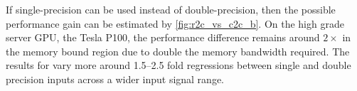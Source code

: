 If single-precision can be used instead of double-precision, then the possible performance gain can be estimated by \cref{fig:r2c_vs_c2c_b}. On the high grade server GPU, the \nvidia{} Tesla P100, the performance difference remains around $2{\times}$ in the memory bound region due to double the memory bandwidth required. The results for \fftw{} vary more around \numrange{1.5}{2.5} fold regressions between single and double precision inputs across a wider input signal range. 


